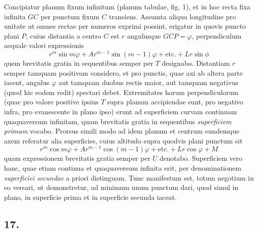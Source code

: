 \documentclass[14pt]{memoir}
\theoremstyle{plain}
\theoremstyle{remark}
\begin{document}
Concipiatur planum fixum infinitum (planum tabulae, fig. 1), et in hoc recta fixa infinita \(GC\) per punctum fixum \(C\) transiens. Assumta aliqua longitudine pro unitate ut omnes rectae per numeros exprimi possint, erigatur in quovis puncto plani \(P\), cuius distantia a centro \(C\) est \(r\) angulusque \(GCP = \varphi\), perpendiculum aequale valori expressionis \[ r^m \sin m \varphi + A r^{m-1} \sin(m-1)\varphi + \text{etc.} + L r\sin \phi \] quem brevitatis gratia in sequentibus semper per \(T\) designabo. Distantiam \(r\) semper tamquam positivam considero, et pro punctis, quae axi ab altera parte iacent, angulus \(\varphi\) aut tamquam duobus rectis maior, aut tamquam negativus (quod hic eodem redit) spectari debet. Extremitates horum perpendiculorum (quae pro valore positive ipsius \(T\) supra planum accipiendae sunt, pro negativo infra, pro evanescente in plano ipso) erunt ad superficiem curvam continuam quaquaversum infinitam, quam brevitatis gratia in sequentibus \textit{superficiem primam} vocabo. Prorsus simili modo ad idem planum et centrum eundemque axem referatur alia superficies, cuius altitudo supra quodvis plani punctum sit \[r^m\cos m\varphi + Ar^{m-1}\cos(m-1)\varphi + \text{etc.}+Lr\cos\varphi+M\] quam expressionem brevitatis gratia semper per \(U\) denotabo. Superficiem vero hanc, quae etiam continua et quaquaversum infinita erit, per denominationem \textit{superficiei secundae} a priori distinguam. Tunc manifestum est, totum negotium in eo versari, ut demonstretur, ad minimum unum punctum dari, quod simul in plano, in superficie prima et in superficie secunda iaceat.

\subsection*{17.} 
\end{document}
